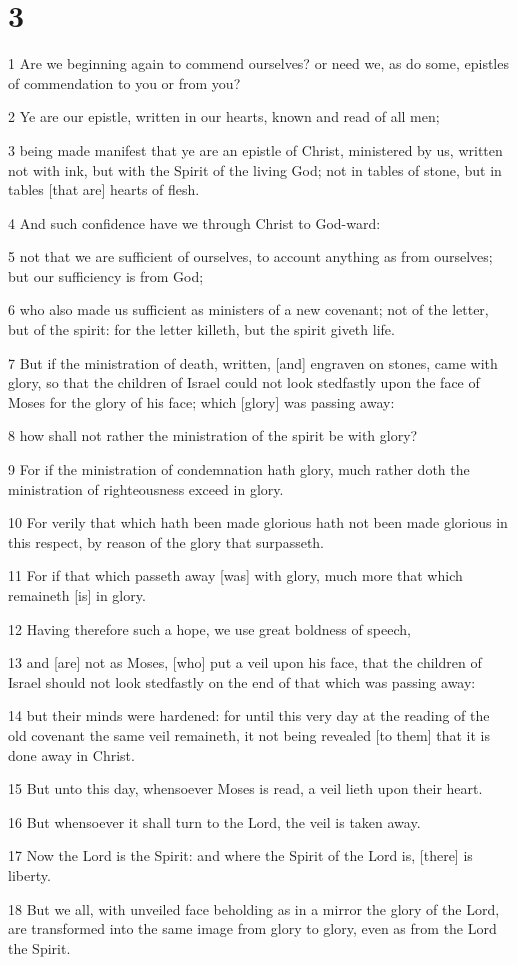 \chapter{3}

\par 1 Are we beginning again to commend ourselves? or need we, as do some, epistles of commendation to you or from you?
\par 2 Ye are our epistle, written in our hearts, known and read of all men;
\par 3 being made manifest that ye are an epistle of Christ, ministered by us, written not with ink, but with the Spirit of the living God; not in tables of stone, but in tables [that are] hearts of flesh.
\par 4 And such confidence have we through Christ to God-ward:
\par 5 not that we are sufficient of ourselves, to account anything as from ourselves; but our sufficiency is from God;
\par 6 who also made us sufficient as ministers of a new covenant; not of the letter, but of the spirit: for the letter killeth, but the spirit giveth life.
\par 7 But if the ministration of death, written, [and] engraven on stones, came with glory, so that the children of Israel could not look stedfastly upon the face of Moses for the glory of his face; which [glory] was passing away:
\par 8 how shall not rather the ministration of the spirit be with glory?
\par 9 For if the ministration of condemnation hath glory, much rather doth the ministration of righteousness exceed in glory.
\par 10 For verily that which hath been made glorious hath not been made glorious in this respect, by reason of the glory that surpasseth.
\par 11 For if that which passeth away [was] with glory, much more that which remaineth [is] in glory.
\par 12 Having therefore such a hope, we use great boldness of speech,
\par 13 and [are] not as Moses, [who] put a veil upon his face, that the children of Israel should not look stedfastly on the end of that which was passing away:
\par 14 but their minds were hardened: for until this very day at the reading of the old covenant the same veil remaineth, it not being revealed [to them] that it is done away in Christ.
\par 15 But unto this day, whensoever Moses is read, a veil lieth upon their heart.
\par 16 But whensoever it shall turn to the Lord, the veil is taken away.
\par 17 Now the Lord is the Spirit: and where the Spirit of the Lord is, [there] is liberty.
\par 18 But we all, with unveiled face beholding as in a mirror the glory of the Lord, are transformed into the same image from glory to glory, even as from the Lord the Spirit.

